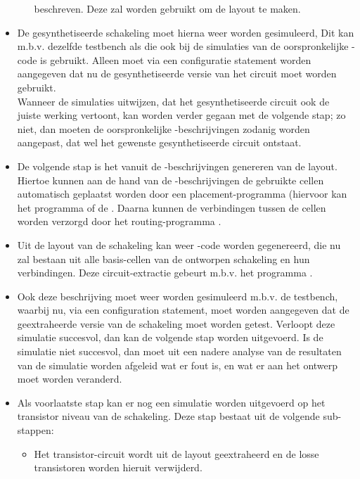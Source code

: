 \begin{itemize}
\begin{itemize}
            beschreven. Deze zal worden gebruikt om de layout te maken. 
      \end{itemize}
\item De gesynthetiseerde schakeling moet hierna weer worden gesimuleerd,
      Dit kan m.b.v. dezelfde testbench als die ook bij de simulaties
      van de oorspronkelijke -code is gebruikt. Alleen moet
      via een configuratie statement worden aangegeven dat nu de
      gesynthetiseerde versie van het circuit moet worden gebruikt.\\
      Wanneer de simulaties uitwijzen, dat het gesynthetiseerde circuit
      ook de juiste werking vertoont, kan worden verder gegaan met de
      volgende stap; zo niet, dan moeten de oorspronkelijke -beschrijvingen
      zodanig worden aangepast, dat wel het gewenste gesynthetiseerde
      circuit ontstaat.
\item De volgende stap is het vanuit de -beschrijvingen genereren van de
      layout. Hiertoe kunnen aan de hand van de -beschrijvingen de
      gebruikte cellen automatisch geplaatst worden door een placement-programma
      (hiervoor kan het programma  of de . 
      Daarna kunnen de verbindingen tussen de cellen
      worden verzorgd door het routing-programma .
\item Uit de layout van de schakeling kan weer
      -code worden gegenereerd, die nu zal bestaan uit
      alle basis-cellen van de ontworpen schakeling en hun verbindingen.
      Deze circuit-extractie gebeurt m.b.v. het programma .
\item Ook deze beschrijving moet weer worden gesimuleerd m.b.v. de
      testbench, waarbij nu, via een configuration statement,
      moet worden aangegeven dat de geextraheerde versie van de scha\-ke\-ling
      moet worden getest. Verloopt deze simulatie succesvol, dan kan de volgende
      stap worden uitgevoerd. Is de simulatie niet succesvol, dan moet uit een
      nadere analyse van de resultaten van de simulatie worden afgeleid wat
      er fout is, en wat er aan het ontwerp moet worden veranderd.
\item Als voorlaatste stap kan er nog een simulatie worden uitgevoerd op
      het transistor niveau van de schakeling.
      Deze stap bestaat uit de volgende sub-stappen:
      \begin{itemize}
      \item Het transistor-circuit wordt uit de layout geextraheerd en de
           losse transistoren worden hieruit verwijderd.

\end{itemize}
\end{itemize}
